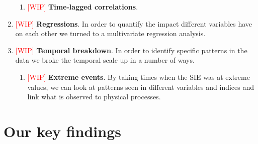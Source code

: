 \documentclass[../main.tex]{subfiles}
\begin{document}
\begin{enumerate}
\begin{enumerate}
        \item \textcolor{red}{[WIP]} \textbf{Time-lagged correlations}.
    \end{enumerate}
    \item \textcolor{red}{[WIP]} \textbf{Regressions}. In order to quantify the impact different variables have on each other we turned to a multivariate regression analysis.
    \item \textcolor{red}{[WIP]} \textbf{Temporal breakdown}. In order to identify specific patterns in the data we broke the temporal scale up in a number of ways.
    \begin{enumerate}
        \item \textcolor{red}{[WIP]} \textbf{Extreme events}. By taking times when the SIE was at extreme values, we can look at patterns seen in different variables and indices and link what is observed to physical processes.
    \end{enumerate}
\end{enumerate}



\section{Our key findings}
\end{document}
